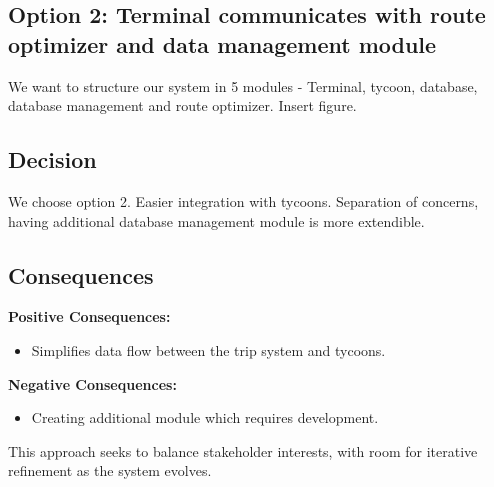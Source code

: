 \subsection*{Option 2: Terminal communicates with route optimizer and data management module}
We want to structure our system in 5 modules - Terminal, tycoon, database, database management and route optimizer.
Insert figure.

\subsection*{Decision}
We choose option 2.
Easier integration with tycoons.
Separation of concerns, having additional database management module is more extendible.

\subsection*{Consequences}
\textbf{Positive Consequences:}
\begin{itemize}
\item Simplifies data flow between the trip system and tycoons.
\end{itemize}
\textbf{Negative Consequences:}
\begin{itemize}
\item Creating additional module which requires development.
\end{itemize}
This approach seeks to balance stakeholder interests, with room for iterative refinement as the system evolves.

